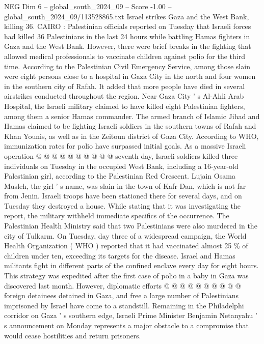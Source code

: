 \begin{textsample}{NEG Dim 6 – global\_south\_2024\_09 – Score -1.00 – global\_south\_2024\_09/113528865.txt}  \label{ex:f6_neg_035}
Israel strikes Gaza and the West Bank, killing 36.
CAIRO : Palestinian officials reported on Tuesday that Israeli forces had killed 36 Palestinians in the last 24 hours while battling Hamas fighters in Gaza and the West Bank.
However, there were brief breaks in the fighting that allowed medical professionals to vaccinate children against polio for the third time.
According to the Palestinian Civil Emergency Service, among those slain were eight persons close to a hospital in Gaza City in the north and four women in the southern city of Rafah.
It added that more people have died in several airstrikes conducted throughout the region.
Near Gaza City ' s Al-Ahli Arab Hospital, the Israeli military claimed to have killed eight Palestinian fighters, among them a senior Hamas commander.
The armed branch of Islamic Jihad and Hamas claimed to be fighting Israeli soldiers in the southern towns of Rafah and Khan Younis, as well as in the Zeitoun district of Gaza City.
According to WHO, immunization rates for polio have surpassed initial goals.
As a massive Israeli operation @ @ @ @ @ @ @ @ @ @ seventh day, Israeli soldiers killed three individuals on Tuesday in the occupied West Bank, including a 16-year-old Palestinian girl, according to the Palestinian Red Crescent.
Lujain Osama Musleh, the girl ' s name, was slain in the town of Kafr Dan, which is not far from Jenin.
Israeli troops have been stationed there for several days, and on Tuesday they destroyed a house.
While stating that it was investigating the report, the military withheld immediate specifics of the occurrence.
The Palestinian Health Ministry said that two Palestinians were also murdered in the city of Tulkarm.
On Tuesday, day three of a widespread campaign, the World Health Organization ( WHO ) reported that it had vaccinated almost 25 \% of children under ten, exceeding its targets for the disease.
Israel and Hamas militants fight in different parts of the confined enclave every day for eight hours.
This strategy was expedited after the first case of polio in a baby in Gaza was discovered last month.
However, diplomatic efforts @ @ @ @ @ @ @ @ @ @ foreign detainees detained in Gaza, and free a large number of Palestinians imprisoned by Israel have come to a standstill.
Remaining in the Philadelphi corridor on Gaza ' s southern edge, Israeli Prime Minister Benjamin Netanyahu ' s announcement on Monday represents a major obstacle to a compromise that would cease hostilities and return prisoners.

\end{textsample}
